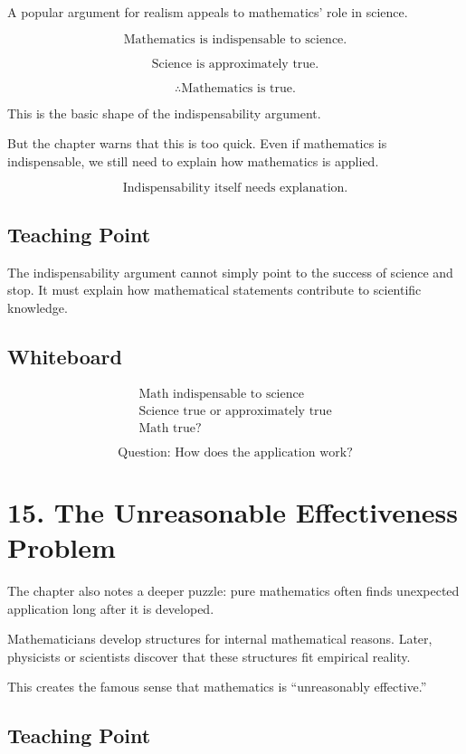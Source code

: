 \documentclass[11pt]{article}
\begin{document}
A popular argument for realism appeals to mathematics' role in science.

\[
\text{Mathematics is indispensable to science.}
\]

\[
\text{Science is approximately true.}
\]

\[
\therefore \text{Mathematics is true.}
\]

This is the basic shape of the indispensability argument.

But the chapter warns that this is too quick. Even if mathematics is indispensable, we still
need to explain how mathematics is applied.

\[
\text{Indispensability itself needs explanation.}
\]

\subsection*{Teaching Point}

The indispensability argument cannot simply point to the success of science and stop. It
must explain how mathematical statements contribute to scientific knowledge.

\subsection*{Whiteboard}

\[
\begin{array}{c}
\text{Math indispensable to science} \\
\text{Science true or approximately true} \\
\hline
\text{Math true?}
\end{array}
\]

\[
\text{Question: How does the application work?}
\]

\section*{15. The Unreasonable Effectiveness Problem}

The chapter also notes a deeper puzzle: pure mathematics often finds unexpected
application long after it is developed.

Mathematicians develop structures for internal mathematical reasons. Later, physicists or
scientists discover that these structures fit empirical reality.

This creates the famous sense that mathematics is ``unreasonably effective.''

\subsection*{Teaching Point}
\end{document}

